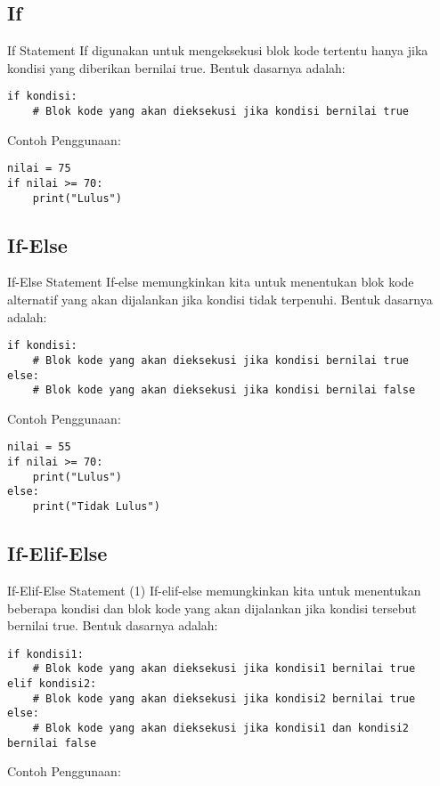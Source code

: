 \documentclass[aspectratio=169, table]{beamer}
\begin{document}
\subsection{If}

\begin{frame}[fragile]{If Statement}
If digunakan untuk mengeksekusi blok kode tertentu hanya jika kondisi yang diberikan bernilai true. Bentuk dasarnya adalah:

\begin{lstlisting}[style=PythonStyle]
if kondisi:
    # Blok kode yang akan dieksekusi jika kondisi bernilai true
\end{lstlisting}

Contoh Penggunaan:

\begin{lstlisting}[style=PythonStyle, caption={if_statement.py}]
nilai = 75
if nilai >= 70:
    print("Lulus")
\end{lstlisting}
\end{frame}

\subsection{If-Else}

\begin{frame}[fragile]{If-Else Statement}
If-else memungkinkan kita untuk menentukan blok kode alternatif yang akan dijalankan jika kondisi tidak terpenuhi. Bentuk dasarnya adalah:

\begin{lstlisting}[style=PythonStyle]
if kondisi:
    # Blok kode yang akan dieksekusi jika kondisi bernilai true
else:
    # Blok kode yang akan dieksekusi jika kondisi bernilai false
\end{lstlisting}

Contoh Penggunaan:

\begin{lstlisting}[style=PythonStyle, caption={if_else_statement.py}]
nilai = 55
if nilai >= 70:
    print("Lulus")
else:
    print("Tidak Lulus")
\end{lstlisting}
\end{frame}

\subsection{If-Elif-Else}

\begin{frame}[fragile]{If-Elif-Else Statement (1)}
If-elif-else memungkinkan kita untuk menentukan beberapa kondisi dan blok kode yang akan dijalankan jika kondisi tersebut bernilai true. Bentuk dasarnya adalah:

\begin{lstlisting}[style=PythonStyle]
if kondisi1:
    # Blok kode yang akan dieksekusi jika kondisi1 bernilai true
elif kondisi2:
    # Blok kode yang akan dieksekusi jika kondisi2 bernilai true
else:
    # Blok kode yang akan dieksekusi jika kondisi1 dan kondisi2 bernilai false
\end{lstlisting}    

Contoh Penggunaan:
\end{frame}
\end{document}
